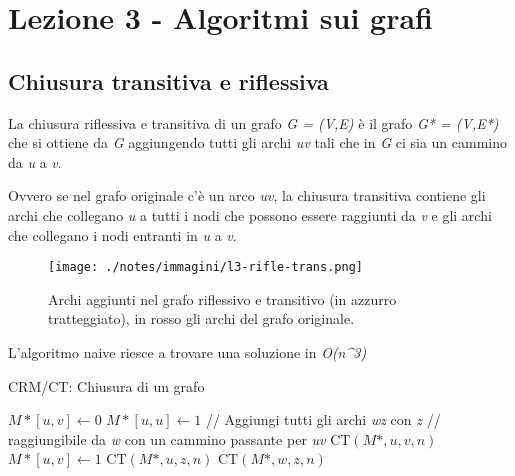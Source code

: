 \section{Lezione 3 - Algoritmi sui
grafi}\label{lezione-3---algoritmi-sui-grafi}

\subsection{Chiusura transitiva e riflessiva}\label{chiusura-transitiva-e-riflessiva}

La chiusura riflessiva e transitiva di un grafo \emph{G = (V,E)} è il
grafo \emph{G* = (V,E*)} che si ottiene da \emph{G} aggiungendo tutti
gli archi \emph{uv} tali che in \emph{G} ci sia un cammino da \emph{u} a
\emph{v}.

Ovvero se nel grafo originale c'è un arco \emph{uv}, la chiusura
transitiva contiene gli archi che collegano \emph{u} a tutti i nodi che
possono essere raggiunti da \emph{v} e gli archi che collegano i nodi
entranti in \emph{u} a \emph{v}.

\begin{figure}[htbp]
\centering
\texttt{[image: ./notes/immagini/l3-rifle-trans.png]}
\caption{Archi aggiunti nel grafo riflessivo e transitivo (in azzurro
tratteggiato), in rosso gli archi del grafo originale.}
\end{figure}

L'algoritmo naive riesce a trovare una soluzione in \emph{O(n\^{}3)}

\begin{breakablealgorithm}
	\caption{CRM/CT: Chiusura di un grafo}
	\begin{algorithmic}[1]
					\State $M*[u,v] \gets 0$
				\EndFor
			\EndFor
				\State $M*[u,u] \gets 1$
			\EndFor
				\State // Aggiungi tutti gli archi \textit{wz} con \textit{z}
				\State // raggiungibile da \textit{w} con un cammino passante per \textit{uv}
				\State \textsc{CT}$(M*,u,v,n)$
				\EndFor
			\EndFor
		\EndFunction
		\Statex
			\State $M*[u,v] \gets 1$
					\State \textsc{CT}$(M*, u, z, n)$
				\EndIf
			\EndFor
					\State \textsc{CT}$(M*, w, z, n)$
				\EndIf
			\EndFor
		\EndFunction
	\end{algorithmic}
\end{breakablealgorithm}

